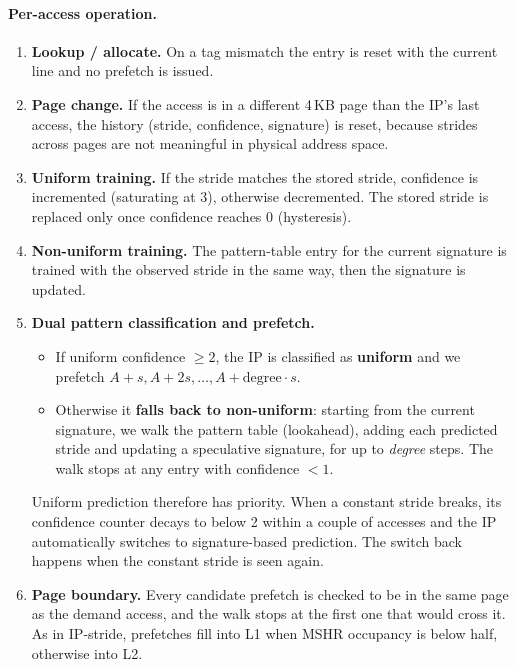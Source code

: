 \documentclass[11pt]{article}
\begin{document}
\paragraph{Per-access operation.}
\begin{enumerate}
  \item \textbf{Lookup / allocate.} On a tag mismatch the entry is reset with the current
        line and no prefetch is issued.
  \item \textbf{Page change.} If the access is in a different 4\,KB page than the IP's
        last access, the history (stride, confidence, signature) is reset, because strides
        across pages are not meaningful in physical address space.
  \item \textbf{Uniform training.} If the stride matches the stored stride, confidence is
        incremented (saturating at 3), otherwise decremented. The stored stride is replaced
        only once confidence reaches 0 (hysteresis).
  \item \textbf{Non-uniform training.} The pattern-table entry for the current signature is
        trained with the observed stride in the same way, then the signature is updated.
  \item \textbf{Dual pattern classification and prefetch.}
    \begin{itemize}
      \item If uniform confidence $\geq 2$, the IP is classified as \textbf{uniform} and we
            prefetch $A+s, A+2s, \dots, A+\text{degree}\cdot s$.
      \item Otherwise it \textbf{falls back to non-uniform}: starting from the current
            signature, we walk the pattern table (lookahead), adding each predicted stride and
            updating a speculative signature, for up to \emph{degree} steps. The walk stops at
            any entry with confidence $<1$.
    \end{itemize}
    Uniform prediction therefore has priority. When a constant stride breaks, its confidence
    counter decays to below 2 within a couple of accesses and the IP automatically switches
    to signature-based prediction. The switch back happens when the constant stride is seen
    again.
  \item \textbf{Page boundary.} Every candidate prefetch is checked to be in the same page as
        the demand access, and the walk stops at the first one that would cross it.
        As in IP-stride, prefetches fill into L1 when MSHR occupancy is below half, otherwise into L2.
\end{enumerate}
\end{document}
